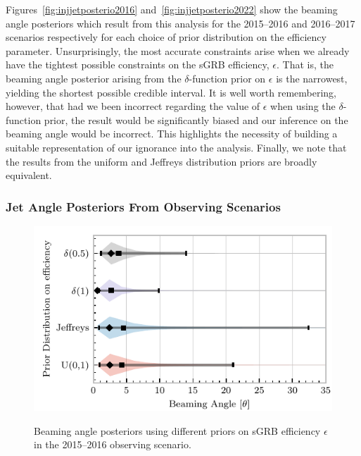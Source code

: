 \documentclass[twocolumn,nofootinbib]{revtex4-1}
\newcommand{\dwnote}[1]{{\color{dwnote}{[\textbf{DW}: #1]}}}
\renewcommand{\dwnote}{}
\newcommand{\arw}[1]{{\color{dgreen}{#1}}}
\begin{document}
%
Figures~\ref{fig:injjetposterio2016} and~\ref{fig:injjetposterio2022}
show the beaming angle posteriors which result from this analysis for
the 2015--2016 and 2016--2017 scenarios respectively for each choice
of prior distribution on the efficiency parameter.  Unsurprisingly,
the most accurate constraints arise when we already have the tightest
possible constraints on the \ac{sGRB} efficiency, $\epsilon$.  That
is, the beaming angle posterior arising from the $\delta$-function
prior on $\epsilon$ is the narrowest, yielding the shortest possible
credible interval.  It is well worth remembering, however, that had
we been incorrect regarding the value of $\epsilon$ when using the
$\delta$-function prior, the result would be significantly biased and
our inference on the beaming angle would be incorrect.  This
highlights the necessity of building a suitable representation of our
ignorance into the analysis.  Finally, we note that the results from
the uniform and Jeffreys distribution priors are broadly equivalent.


\subsubsection{Jet Angle Posteriors From Observing Scenarios}

\begin{figure}
\centering
{\includegraphics[width=\linewidth]{O1_beaming_posteriors_violin.pdf}}
\caption{Beaming angle posteriors using different priors on \ac{sGRB} efficiency $\epsilon$ in the 2015--2016 observing scenario.
  \arw{Make grid lines like Figure 5?}
    \label{fig:jetposterior2016}}
\end{figure}
\end{document}
